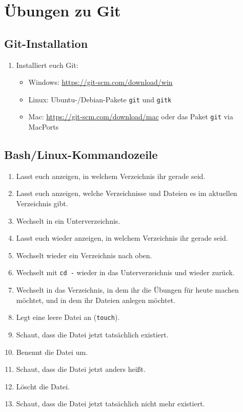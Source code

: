 \documentclass[a4paper,12pt]{scrartcl}
\begin{document}
\raggedbottom

\section{Übungen zu Git}

\subsection{Git-Installation}
\begin{enumerate}
  \item Installiert euch Git:
    \begin{itemize}
      \item Windows: \url{https://git-scm.com/download/win}
      \item Linux: Ubuntu-/Debian-Pakete \texttt{git} und \texttt{gitk}
      \item Mac: \url{https://git-scm.com/download/mac} oder das Paket \texttt{git} via MacPorts
    \end{itemize}
\end{enumerate}

\subsection{Bash/Linux-Kommandozeile}
\begin{enumerate}
  \item Lasst euch anzeigen, in welchem Verzeichnis ihr gerade seid.
  \item Lasst euch anzeigen, welche Verzeichnisse und Dateien es im aktuellen Verzeichnis gibt.
  \item Wechselt in ein Unterverzeichnis.
  \item Lasst euch wieder anzeigen, in welchem Verzeichnis ihr gerade seid.
  \item Wechselt wieder ein Verzeichnis nach oben.
  \item Wechselt mit \texttt{cd -} wieder in das Unterverzeichnis und wieder zurück.
  \item Wechselt in das Verzeichnis, in dem ihr die Übungen für heute machen möchtet, und in dem ihr Dateien anlegen möchtet.
  \item Legt eine leere Datei an (\texttt{touch}).
  \item Schaut, dass die Datei jetzt tatsächlich existiert.
  \item Benennt die Datei um.
  \item Schaut, dass die Datei jetzt anders heißt.
  \item Löscht die Datei.
  \item Schaut, dass die Datei jetzt tatsächlich nicht mehr existiert.
\end{enumerate}
\end{document}
